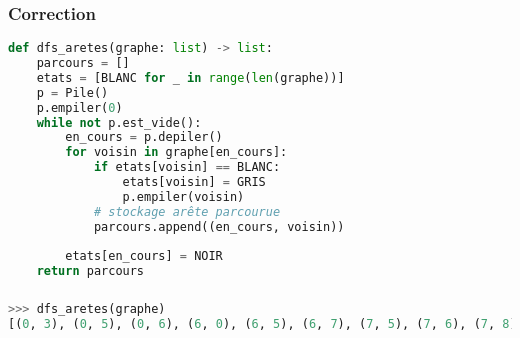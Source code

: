 \documentclass[svgnames,11pt]{beamer}
\begin{document}
\begin{frame}[fragile]
    \frametitle{Correction}
\begin{center}
\begin{lstlisting}[language=Python , basicstyle=\ttfamily\small, xleftmargin=0.2em, xrightmargin=-1em]
def dfs_aretes(graphe: list) -> list:
    parcours = []
    etats = [BLANC for _ in range(len(graphe))]
    p = Pile()
    p.empiler(0)
    while not p.est_vide():
        en_cours = p.depiler()
        for voisin in graphe[en_cours]:
            if etats[voisin] == BLANC:
                etats[voisin] = GRIS
                p.empiler(voisin)
            # stockage arête parcourue
            parcours.append((en_cours, voisin))
                
        etats[en_cours] = NOIR
    return parcours
\end{lstlisting}

\end{center}
    

\end{frame}
\begin{frame}[fragile]
    \frametitle{}
    \begin{center}
    \end{center}
\begin{center}
\begin{lstlisting}[language=Python , basicstyle=\ttfamily\small, xleftmargin=0.2em, xrightmargin=0.5em]
>>> dfs_aretes(graphe)
[(0, 3), (0, 5), (0, 6), (6, 0), (6, 5), (6, 7), (7, 5), (7, 6), (7, 8), (8, 7), (5, 0), (5, 6), (5, 7), (3, 0), (3, 2), (3, 4), (4, 2), (4, 3), (2, 1), (2, 3), (2, 4), (1, 2), (1, 9), (9, 1)]
\end{lstlisting}
\label{CODE}
\end{center}
\end{frame}
\end{document}
